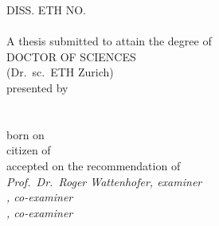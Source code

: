 { %
%
\vspace*{\fill}%
\begin{minipage}{0.9\textwidth}	
  \vspace{-1cm}
  
  \centering
  \sffamily
  
  DISS. ETH NO. \DISSNUMBER \\[3\baselineskip]

  {
    \huge
    \bfseries
    \linespread{1.8}
    \BOOKTITLE  %
  }	\\[3\baselineskip]


  A thesis submitted to attain the degree of \\[1\baselineskip]

  DOCTOR OF SCIENCES \\[.6\baselineskip]
  (Dr.\ sc.\ ETH Zurich) \\[3\baselineskip]


  presented by \\[1\baselineskip]

  {\large \itshape \uppercase\expandafter{\AUTHOR}} \\[1\baselineskip]

  {\itshape \MASTERDEGREE} \\[.2\baselineskip]
  born on \BIRTHDATE \\[.2\baselineskip]
  citizen of %
  \CITIZENSHIP \\[3\baselineskip]


  accepted on the recommendation of \\[1\baselineskip]

  {\itshape
  Prof.\ Dr.\ Roger Wattenhofer, examiner \\[.2\baselineskip]
  \COEXAMINERONE, co-examiner \ifx \COEXAMINERTWO \undefined \else \\[.2\baselineskip] \COEXAMINERTWO, co-examiner \fi
  } \\[3\baselineskip]

  \ACCEPTYEAR

\end{minipage}
\vspace*{\fill}
}
